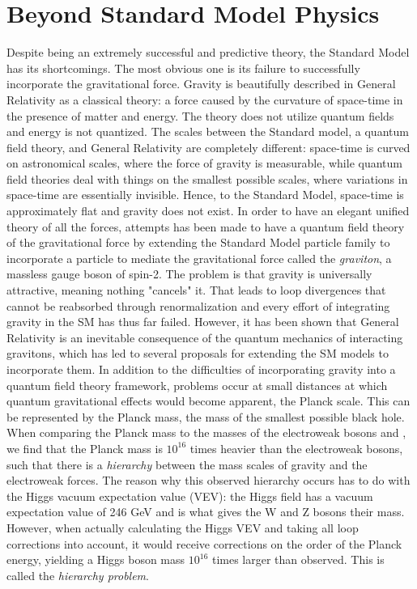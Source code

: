 \section{Beyond Standard Model Physics}
Despite being an extremely successful and predictive theory, the Standard Model has its shortcomings. The most obvious one is its failure to successfully incorporate the gravitational force. Gravity is beautifully described in General Relativity as a classical theory: a force caused by the curvature of space-time in the presence of matter and energy. The theory does not utilize quantum fields and energy is not quantized.
The scales between the Standard model, a quantum field theory, and General Relativity are completely different: space-time is curved on astronomical scales, where the force of gravity is measurable, while quantum field theories deal with things on the smallest possible scales, where variations in space-time are essentially invisible. Hence, to the Standard Model, space-time is approximately flat and gravity does not exist. In order to have an elegant unified theory of all the forces, attempts has been made to have a quantum field theory of the gravitational force by extending the Standard Model particle family to incorporate a particle to mediate the gravitational force called the \emph{graviton}, a massless gauge boson of spin-2. The problem is that gravity is universally attractive, meaning nothing "cancels" it. That leads to loop divergences that cannot be reabsorbed through renormalization and every effort of integrating gravity in the SM has thus far failed. However, it has been shown that General Relativity is an inevitable consequence of the quantum mechanics of interacting gravitons, which has led to several proposals for extending the SM models to incorporate them.\newline
In addition to the difficulties of incorporating gravity into a quantum field theory framework, problems occur at small distances at which quantum gravitational effects would become apparent, the Planck scale. This can be represented by the Planck mass, the mass of the smallest possible black hole. When comparing the Planck mass to the masses of the electroweak bosons \PW and \PZ, we find that the Planck mass is $10^{16}$ times heavier than the electroweak bosons, such that there is a \emph{hierarchy} between the mass scales of gravity and the electroweak forces. The reason why this observed hierarchy occurs has to do with the Higgs vacuum expectation value (VEV): the Higgs field has a vacuum expectation value of 246 GeV and is what gives the W and Z bosons their mass. However, when actually calculating the Higgs VEV and taking all loop corrections into account, it would receive corrections on the order of the Planck energy, yielding a Higgs boson mass $10^{16}$ times larger than observed. This is called the \emph{hierarchy problem}.
